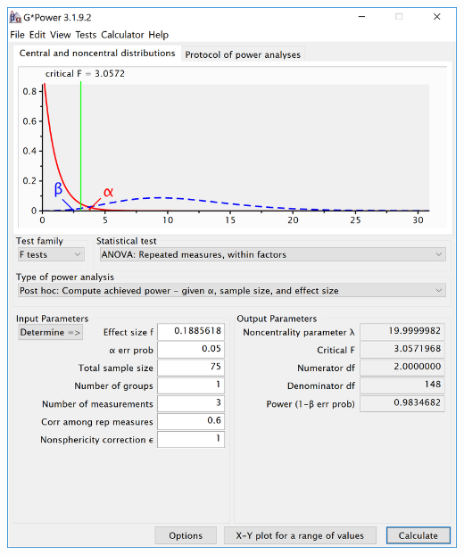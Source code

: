 \documentclass[
]{book}
\begin{document}
\includegraphics{screenshots/gpower_4.png}

  
\end{document}
